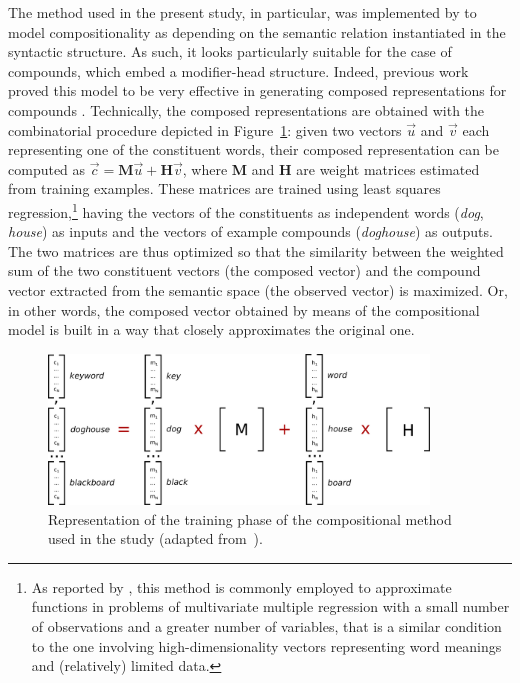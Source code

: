 \documentclass[output=paper]{langsci/langscibook}
\begin{document}
The method used in the present study, in particular, was implemented by \cite{guevara2010} to model compositionality as depending on the semantic relation instantiated in the syntactic structure. As such, it looks particularly suitable for the case of compounds, which embed a modifier-head structure. Indeed, previous work proved this model to be very effective in generating composed representations for compounds \citep{marelli2017}. Technically, the composed representations are obtained with the combinatorial procedure depicted in Figure~\ref{fig:caoss}: given two vectors \(\overrightarrow{u}\) and \(\overrightarrow{v}\) each representing one of the constituent words, their composed representation can be computed as \(\overrightarrow{c} = \mathbf{M}\overrightarrow{u} + \mathbf{H}\overrightarrow{v}\), where \textbf{M} and \textbf{H} are weight matrices estimated from training examples. These matrices are trained using least squares regression,\footnote{As reported by \cite{guevara2010}, this method is commonly employed to approximate functions in problems of multivariate multiple regression with a small number of observations and a greater number of variables, that is a similar condition to the one involving high-dimensionality vectors representing word meanings and (relatively) limited data.} having the vectors of the constituents as independent words (\textit{dog}, \textit{house}) as inputs and the vectors of example compounds (\textit{doghouse}) as outputs. The two matrices are thus optimized so that the similarity between the weighted sum of the two constituent vectors (the composed vector) and the compound vector extracted from the semantic space (the observed vector) is maximized. Or, in other words, the composed vector obtained by means of the compositional model is built in a way that closely approximates the original one.


\begin{figure}[t!]
\begin{center}
\includegraphics[width=0.9\textwidth]{figures/plsr1.png}
\caption{Representation of the training phase of the compositional method used in the study (adapted from~\citealt{marelli2017}).}\label{fig:caoss}
\end{center}
\end{figure}
\end{document}
